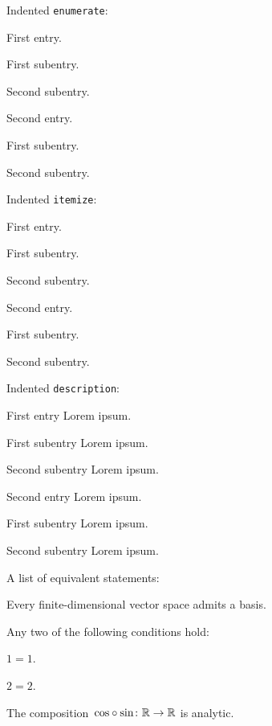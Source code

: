 \noindent
Indented \texttt{enumerate}:
\begin{enumerate*}
	\item
		First entry.
		\begin{enumerate*}
			\item
				First subentry.
			\item
				Second subentry.
		\end{enumerate*}
	\item
		Second entry.
		\begin{enumerate*}
			\item
				First subentry.
			\item
				Second subentry.
		\end{enumerate*}
\end{enumerate*}
Indented \texttt{itemize}:
\begin{itemize*}
	\item
		First entry.
		\begin{itemize*}
			\item
				First subentry.
			\item
				Second subentry.
			\end{itemize*}
	\item
		Second entry.
		\begin{itemize*}
			\item
				First subentry.
			\item
				Second subentry.
		\end{itemize*}
\end{itemize*}
Indented \texttt{description}:
\begin{description*}
	\item[First entry]
		Lorem ipsum.
		\begin{description*}
			\item[First subentry]
				Lorem ipsum.
			\item[Second subentry]
				Lorem ipsum.
		\end{description*}
	\item[Second entry]
		Lorem ipsum.
		\begin{description*}
			\item[First subentry]
				Lorem ipsum.
			\item[Second subentry]
				Lorem ipsum.
		\end{description*}
\end{description*}
A list of equivalent statements:
\begin{equivlist}
	\item
		\label{every fd vs has a basis}
		Every finite-dimensional vector space admits a basis.
	\item
		\label{any two of the equalities}
		Any two of the following conditions hold:
		\begin{equivlist}
			\item
				$1 = 1$.
			\item
				$2 = 2$.
		\end{equivlist} 
	\item
		\label{composition is analytic}
		The composition~${\cos} \circ {\sin} \colon \mathbb{R} \to \mathbb{R}$ is analytic.
\end{equivlist}
